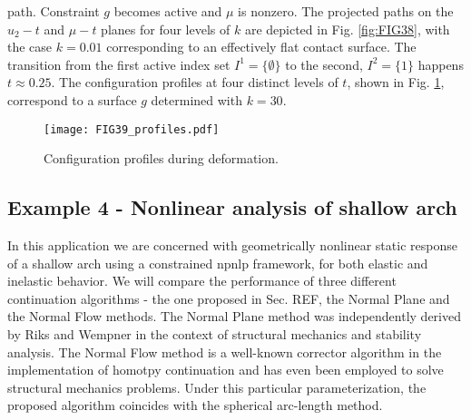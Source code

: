 path. Constraint $g$ becomes active and $\mu$ is nonzero. The projected paths
on the $u_2-t$ and $\mu-t$ planes for four levels of $k$ are
depicted in Fig. \ref{fig:FIG38}, with the case $k=0.01$ corresponding to an 
effectively
flat contact surface. The transition from the first active index set
$I^1=\{\emptyset\}$ to the second, $I^2=\{1\}$ happens $t\approx 0.25$.
The configuration profiles at four distinct levels of $t$, shown in
Fig. \ref{fig:FIG39_Profiles}, correspond to a surface $g$ determined with 
$k=30$.
\begin{figure*}[t]
	\centering
	\qquad
	\caption{Projection of path \textbf{(a)} on $u_2-t$ plane and
		\textbf{(b)} $\mu-t$ plane.}%
	\label{fig:FIG38}%
\end{figure*}
\begin{figure}[b!]
	\centering
	\texttt{[image: FIG39\_profiles.pdf]}
	\caption{Configuration profiles during deformation.}
	\label{fig:FIG39_Profiles}
\end{figure}

\subsection{Example 4 - Nonlinear analysis of shallow arch}

In this application we are concerned with geometrically 
nonlinear static response 
of a shallow arch using a constrained \acrshort{npnlp} framework, for both 
elastic and inelastic behavior. We will compare the performance of three 
different continuation algorithms - the one proposed in Sec. REF, the Normal 
Plane and the Normal Flow methods. The Normal Plane method was independently 
derived by Riks\cite{Riks:1979} and Wempner\cite{Wempner:1971} in the context 
of structural mechanics and stability analysis. The Normal Flow method is a 
well-known corrector algorithm in the implementation of homotpy 
continuation\cite{Watson:1989,Watson:1990} and has even been employed to solve 
structural mechanics 
problems\cite{Ragon:2002,Sideris:2017}. Under this particular parameterization, the 
proposed algorithm coincides with the spherical arc-length method\cite{Crisfield3}.

